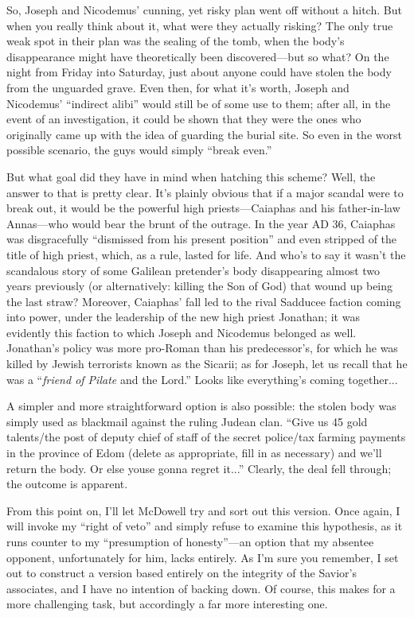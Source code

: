 So, Joseph and Nicodemus' cunning, yet risky plan went off without a hitch. But when you really think about it, what were they actually risking? The only true weak spot in their plan was the sealing of the tomb, when the body's disappearance might have theoretically been discovered---but so what? On the night from Friday into Saturday, just about anyone could have stolen the body from the unguarded grave. Even then, for what it's worth, Joseph and Nicodemus' ``indirect alibi'' would still be of some use to them; after all, in the event of an investigation, it could be shown that they were the ones who originally came up with the idea of guarding the burial site. So even in the worst possible scenario, the guys would simply ``break even.''

But what goal did they have in mind when hatching this scheme? Well, the answer to that is pretty clear. It's plainly obvious that if a major scandal were to break out, it would be the powerful high priests---Caiaphas and his father-in-law Annas---who would bear the brunt of the outrage. In the year AD 36, Caiaphas was disgracefully ``dismissed from his present position'' and even stripped of the title of high priest, which, as a rule, lasted for life. And who's to say it wasn't the scandalous story of some Galilean pretender's body disappearing almost two years previously (or alternatively: killing the Son of God) that wound up being the last straw? Moreover, Caiaphas' fall led to the rival Sadducee faction coming into power, under the leadership of the new high priest Jonathan; it was evidently this faction to which Joseph and Nicodemus belonged as well. Jonathan's policy was more pro-Roman than his predecessor's, for which he was killed by Jewish terrorists known as the Sicarii; as for Joseph, let us recall that he was a ``\emph{friend of Pilate} and the Lord.'' Looks like everything's coming together...

A simpler and more straightforward option is also possible: the stolen body was simply used as blackmail against the ruling Judean clan. ``Give us 45 gold talents/the post of deputy chief of staff of the secret police/tax farming payments in the province of Edom (delete as appropriate, fill in as necessary) and we'll return the body. Or else youse gonna regret it...'' Clearly, the deal fell through; the outcome is apparent.

From this point on, I'll let McDowell try and sort out this version. Once again, I will invoke my ``right of veto'' and simply refuse to examine this hypothesis, as it runs counter to my ``presumption of honesty''---an option that my absentee opponent, unfortunately for him, lacks entirely. As I'm sure you remember, I set out to construct a version based entirely on the integrity of the Savior's associates, and I have no intention of backing down. Of course, this makes for a more challenging task, but accordingly a far more interesting one.

